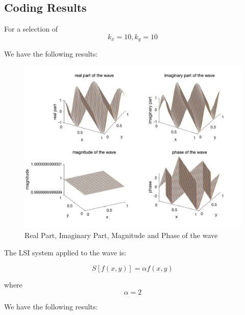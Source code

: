 \documentclass[11pt,a4paper,BCOR12mm, headexclude, footexclude, twoside, openright]{scrartcl}
\numberwithin{equation}{section} %
\numberwithin{figure}{section} %
\numberwithin{table}{section} %
\begin{document}
\subsection{Coding Results}

For a selection of 
\begin{equation}
   k_x = 10, k_y = 10
\end{equation}

We have the following results:

\begin{figure}[h!]
\centering
\includegraphics[scale=0.35]{wave2.jpg}
\caption{Real Part, Imaginary Part, Magnitude and Phase of the wave}
\end{figure}

\newpage

The LSI system applied to the wave is:

\begin{equation}
   S[f(x,y)] = \alpha f(x,y)
\end{equation}

where 
\begin{equation}
   \alpha = 2
\end{equation}

We have the following results:
\end{document}

